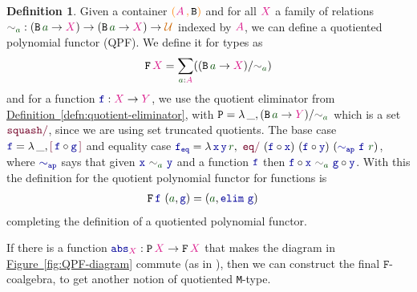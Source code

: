 \documentclass[twoside,11pt,openright]{report}
\theoremstyle{plain} %
\theoremstyle{definition}
\newtheorem{defn}[thm]{Definition}%
\theoremstyle{remark}
\newcommand*{\defref}[1]{\hyperref[defn:#1]{Definition~\ref*{defn:#1}}}
\newcommand*{\figref}[1]{\hyperref[fig:#1]{Figure~\ref*{fig:#1}}}
\newcommand*{\term}[1]{\textcolor{green!30!black}{#1}} %
\newcommand*{\type}[1]{\textcolor{magenta!90!black}{#1}}
\newcommand*{\containerpair}[2]{\ensuremath{\colorlet{savedleftcolor}{.}\color{orange}\left(\color{savedleftcolor}#1\,\textcolor{orange}{\mathbf{,}}\,#2\color{orange}\right)\color{savedleftcolor}}}
\newcommand*{\universe}[1]{\textcolor{orange!80!black}{#1}}
\newcommand*{\relation}[1]{\textcolor{gray!75!black}{\ensuremath{\mathtt{#1}}}}
\newcommand*{\function}[1]{\textcolor{blue!60!black}{\ensuremath{\mathtt{#1}}}}
\newcommand*{\constructor}[1]{\textcolor{purple!60!black}{\ensuremath{\mathtt{#1}}}}
\newcommand*{\typeformer}[1]{\ensuremath{\mathtt{#1}}}
\newcommand*{\functor}[1]{\ensuremath{\mathbf{\mathtt{#1}}}}
\newcommand*{\quotientconstructor}[1]{\constructor{[}\,#1\,\constructor{]}}
\begin{document}
\begin{defn}
  Given a container \(\containerpair{\type{A}}{\typeformer{B}}\) and for all \(\type{X}\) a family of relations \(\relation{\sim}_{\term{a}} : (\typeformer{B}\,\term{a} \rightarrow \type{X}) \rightarrow (\typeformer{B}\,\term{a} \rightarrow \type{X}) \rightarrow \universe{\mathcal{U}}\) indexed by \(\type{A}\), we can define a quotiented polynomial functor (QPF). We define it for types as
  \begin{equation}
    \functor{F}\,\type{X} =  \sum_{\term{a} : \type{A}} ((\typeformer{B}\,\term{a} \rightarrow \type{X}) / \relation{\sim}_{\term{a}})
  \end{equation}
  and for a function \(\function{f} : \type{X} \rightarrow \type{Y}\), we use the quotient eliminator from \defref{quotient-eliminator}, with \(\typeformer{P} = \lambda\,\_, (\typeformer{B}\,\term{a} \rightarrow \type{Y})/\relation{\sim}_{\term{a}}\) which is a set \(\constructor{squash/}\), since we are using set truncated quotients. The base case \(\function{f} = \lambda\,\_,\quotientconstructor{\function{f} \circ \function{g}}\) and equality case \(\function{f_{eq}} = \lambda\,\function{x}\,\function{y}\,\term{r},~\constructor{eq/}~(\function{f} \circ \function{x})~(\function{f} \circ \function{y})~(\function{\sim_{ap}}~\function{f}~\term{r})\), where \(\function{\sim_{ap}}\) says that given \(\function{x}~\relation{\sim}_{\term{a}}~\function{y}\) and a function \(\function{f}\) then \(\function{f} \circ \function{x}~\relation{\sim}_{\term{a}}~\function{g} \circ \function{y}\). With this the definition for the quotient polynomial functor for functions is
  \begin{equation}
    \begin{aligned}
      &\functor{F}\,\function{f}~(\term{a} , \function{g}) = (\term{a} , \function{elim}~\function{g})
    \end{aligned} 
  \end{equation}
  completing the definition of a quotiented polynomial functor.
\end{defn}
\noindent If there is a function \(\function{abs}_{\type{X}} : \functor{P}\,\type{X} \rightarrow \functor{F}\,\type{X}\) that makes the diagram in \figref{QPF-diagram} commute (as in \cite{DBLP:QM-lean}), then we can construct the final \(\functor{F}\)-coalgebra, to get another notion of quotiented \texttt{M}-type.
\end{document}
